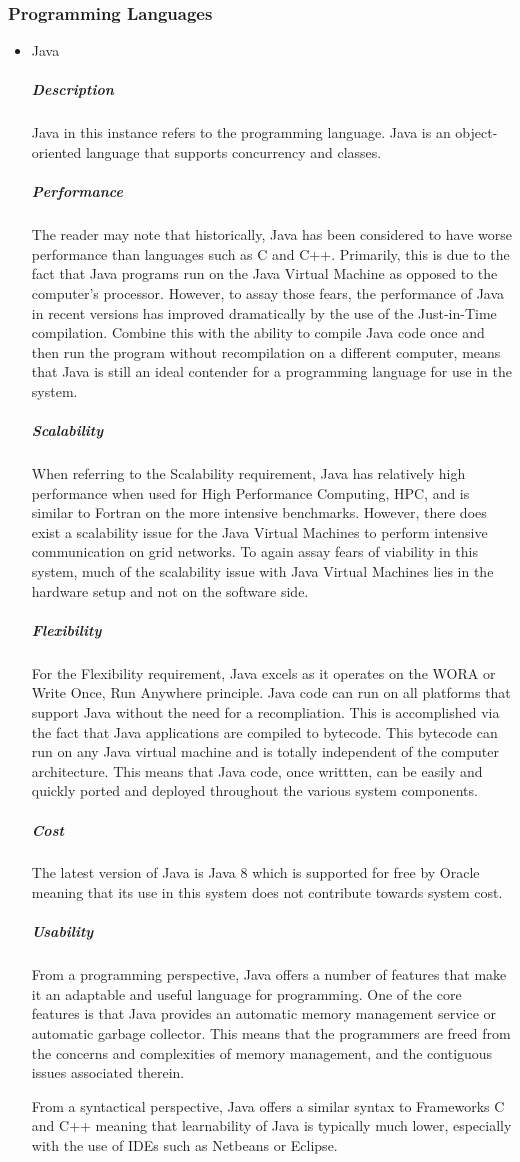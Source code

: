 \documentclass[a4paper,10pt]{article}
\begin{document}
\subsubsection{Programming Languages}
	\begin{itemize}
		\item Java
			\subparagraph{Description}
			Java in this instance refers to the programming language. Java is an object-oriented language that supports concurrency and classes. 		\subparagraph{Performance}
			The reader may note that historically, Java has been considered to have worse performance than languages such as C and C++. Primarily, this is due to the fact that Java programs run on the Java Virtual Machine as opposed to the computer's processor. However, to assay those fears, the performance of Java in recent versions has improved dramatically by the use of the Just-in-Time compilation. Combine this with the ability to compile Java code once and then run the program without recompilation on a different computer, means that Java is still an ideal contender for a programming language for use in the system.
					\subparagraph{Scalability}
			When referring to the Scalability requirement, Java has relatively high performance when used for High Performance Computing, HPC, and is similar to Fortran on the more intensive benchmarks. However, there does exist a scalability issue for the Java Virtual Machines to perform intensive communication on grid networks. To again assay fears of viability in this system, much of the scalability issue with Java Virtual Machines lies in the hardware setup and not on the software side.		
				
			\subparagraph{Flexibility}
			For the Flexibility requirement, Java excels as it operates on the WORA or Write Once, Run Anywhere principle. Java code can run on all platforms that support Java without the need for a recompliation. This is accomplished via the fact that Java applications are compiled to bytecode. This bytecode can run on any Java virtual machine and is totally independent of the computer architecture. This means that Java code, once writtten, can be easily and quickly ported and deployed throughout the various system components.


			\subparagraph{Cost}
			The latest version of Java is Java 8 which is supported for free by Oracle meaning that its use in this system does not contribute towards system cost.
			\subparagraph{Usability}
			From a programming perspective, Java offers a number of features that make it an adaptable and useful language for programming. One of the core features is that Java provides an automatic memory management service or automatic garbage collector. This means that the programmers are freed from the concerns and complexities of memory management, and the contiguous issues associated therein.

			From a syntactical perspective, Java offers a similar syntax to 
			Frameworks C and C++ meaning that learnability of Java is typically much lower, especially with the use of IDEs such as Netbeans or Eclipse.
\end{itemize}
\end{document}
